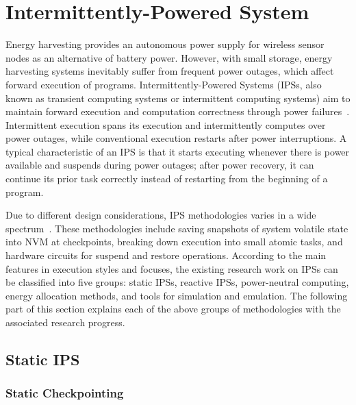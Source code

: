 \section{Intermittently-Powered System} \label{sec:ips}

Energy harvesting provides an autonomous power supply for wireless sensor nodes as an alternative of battery power. 
However, with small storage, energy harvesting systems inevitably suffer from frequent power outages, which affect forward execution of programs. 
Intermittently-Powered Systems (IPSs, also known as transient computing systems or intermittent computing systems) aim to maintain forward execution and computation correctness through power failures~\cite{ransford2012mementos}. 
Intermittent execution spans its execution and intermittently computes over power outages, while conventional execution restarts after power interruptions. 
A typical characteristic of an IPS is that it starts executing whenever there is power available and suspends during power outages; after power recovery, it can continue its prior task correctly instead of restarting from the beginning of a program. 

Due to different design considerations, IPS methodologies varies in a wide spectrum~\cite{sliper2018enabling}. 
These methodologies include saving snapshots of system volatile state into NVM at checkpoints, breaking down execution into small atomic tasks, and hardware circuits for suspend and restore operations. 
According to the main features in execution styles and focuses, the existing research work on IPSs can be classified into five groups: static IPSs, reactive IPSs, power-neutral computing, energy allocation methods, and tools for simulation and emulation. 
The following part of this section explains each of the above groups of methodologies with the associated research progress.

\subsection{Static IPS}


\subsubsection{Static Checkpointing}

